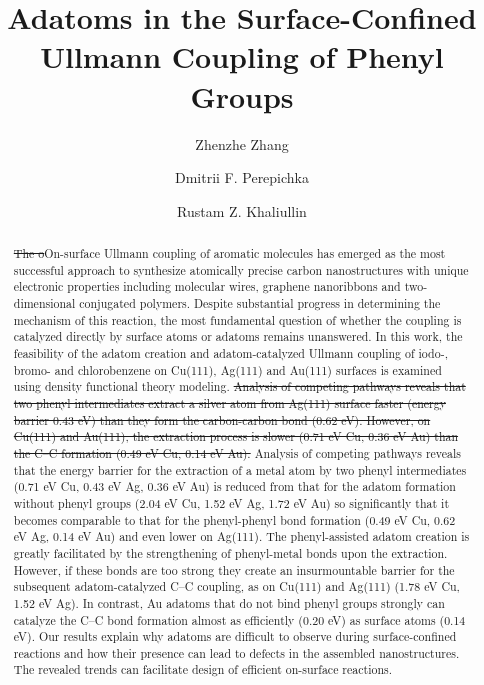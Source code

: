 \documentclass[aps,prb,amsmath,amssymb,11pt]{revtex4-1}
\newcommand{\zhzh}{\color{blue}}
\begin{document}
\title
{Adatoms in the Surface-Confined Ullmann Coupling of Phenyl Groups}

\author{Zhenzhe Zhang}
\author{Dmitrii F. Perepichka}%
\author{Rustam Z. Khaliullin}
%


\begin{abstract}
\sout{The o}{\zhzh O}n-surface Ullmann coupling of aromatic molecules has emerged as the most successful approach to synthesize atomically precise carbon nanostructures with unique electronic properties including molecular wires, graphene nanoribbons and two-dimensional conjugated polymers. Despite substantial progress in determining the mechanism of this reaction, the most fundamental question of whether the coupling is catalyzed directly by surface atoms or adatoms remains unanswered. In this work, the feasibility of the adatom creation and adatom-catalyzed Ullmann coupling of  iodo-, bromo- and chlorobenzene on Cu(111), Ag(111) and Au(111) surfaces is examined using density functional theory modeling. 
\sout{Analysis of competing pathways reveals that two phenyl intermediates extract a silver atom from Ag(111) surface faster (energy barrier 0.43 eV) than they form the carbon-carbon bond (0.62 eV). However, on Cu(111) and Au(111), the extraction process is slower (0.71 eV Cu, 0.36 eV Au) than the C--C formation (0.49 eV Cu, 0.14 eV Au).} 
{\zhzh Analysis of competing pathways reveals that the energy barrier for the extraction of a metal atom by two phenyl intermediates (0.71 eV Cu, 0.43 eV Ag, 0.36 eV Au) is reduced from that for the adatom formation without phenyl groups (2.04 eV Cu, 1.52 eV Ag, 1.72 eV Au) so significantly that it becomes comparable to that for the phenyl-phenyl bond formation (0.49 eV Cu, 0.62 eV Ag, 0.14 eV Au) and even lower on Ag(111).} 
The {\zhzh phenyl-assisted} adatom creation is greatly facilitated by the strengthening of phenyl-metal bonds upon the extraction. However, if these bonds are too strong they create an insurmountable barrier for the subsequent adatom-catalyzed C--C coupling, as on Cu(111) and Ag(111) (1.78 eV Cu, 1.52 eV Ag). In contrast, Au adatoms that do not bind phenyl groups strongly can catalyze the C--C bond formation almost as efficiently (0.20 eV) as surface atoms (0.14 eV). Our results explain why adatoms are difficult to observe during surface-confined reactions and how their presence can lead to defects in the assembled nanostructures. The revealed trends can facilitate design of efficient on-surface reactions.


\end{abstract}
\end{document}
